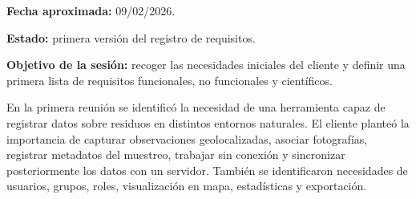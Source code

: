 \textbf{Fecha aproximada:} 09/02/2026.

\textbf{Estado:} primera versión del registro de requisitos.

\textbf{Objetivo de la sesión:} recoger las necesidades iniciales del cliente y
definir una primera lista de requisitos funcionales, no funcionales y científicos.

En la primera reunión se identificó la necesidad de una herramienta capaz de
registrar datos sobre residuos en distintos entornos naturales. El cliente planteó
la importancia de capturar observaciones geolocalizadas, asociar fotografías,
registrar metadatos del muestreo, trabajar sin conexión y sincronizar
posteriormente los datos con un servidor. También se identificaron necesidades de
usuarios, grupos, roles, visualización en mapa, estadísticas y exportación.

